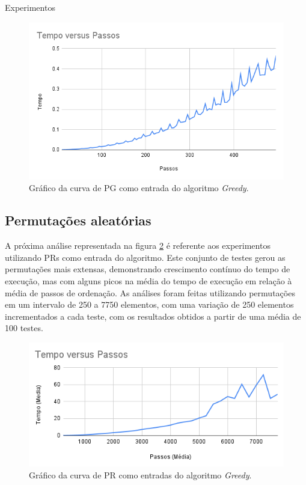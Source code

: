 \begin{chapter}{Experimentos}
\begin{figure}[H]
  \centering
  \begin{minipage}[t]{0.5\textwidth}
    \includegraphics[width=\textwidth]{Imagens/Analises/G_PG2.png}
    \caption{\label{Grafico4} Gráfico da curva de PG como entrada do algoritmo \textit{Greedy}.}
  \end{minipage}
\end{figure}
    
\subsection{Permutações aleatórias}
    
A próxima análise representada na figura \ref{Grafico5} é referente aos experimentos utilizando PRs como entrada do algoritmo. Este conjunto de testes gerou as permutações mais extensas, demonstrando crescimento contínuo do tempo de execução, mas com alguns picos na média do tempo de execução em relação à média de passos de ordenação. As análises foram feitas utilizando permutações em um intervalo de 250 a 7750 elementos, com uma variação de 250 elementos incrementados a cada teste, com os resultados obtidos a partir de uma média de 100 testes.

\begin{figure}[H]
  \centering
  \begin{minipage}[t]{0.6\textwidth}
    \includegraphics[width=\textwidth]{Imagens/Analises/G_PR2.png}
    \caption{\label{Grafico5} Gráfico da curva de PR como entradas do algoritmo \textit{Greedy}.}
  \end{minipage}
\end{figure}
    

\end{chapter}
